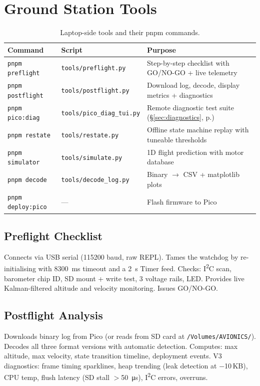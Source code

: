 \documentclass[11pt, a4paper, twoside]{article}
\newcommand{\file}[1]{\texttt{#1}}
\newcommand{\xref}[1]{(\S\ref{#1}, p.\pageref{#1})}
\begin{document}
\section{Ground Station Tools}
\label{sec:tools}

\begin{table}[ht]
\centering
\caption{Laptop-side tools and their pnpm commands.}
\label{tab:tools}
\begin{tabularx}{\textwidth}{l l X}
\toprule
\textbf{Command} & \textbf{Script} & \textbf{Purpose} \\
\midrule
\texttt{pnpm preflight} & \file{tools/preflight.py} & Step-by-step checklist with GO/NO-GO + live telemetry \\
\texttt{pnpm postflight} & \file{tools/postflight.py} & Download log, decode, display metrics + diagnostics \\
\texttt{pnpm pico:diag} & \file{tools/pico\_diag\_tui.py} & Remote diagnostic test suite \xref{sec:diagnostics} \\
\texttt{pnpm restate} & \file{tools/restate.py} & Offline state machine replay with tuneable thresholds \\
\texttt{pnpm simulator} & \file{tools/simulate.py} & 1D flight prediction with motor database \\
\texttt{pnpm decode} & \file{tools/decode\_log.py} & Binary $\to$ CSV + matplotlib plots \\
\texttt{pnpm deploy:pico} & --- & Flash firmware to Pico \\
\bottomrule
\end{tabularx}
\end{table}

\subsection{Preflight Checklist}
Connects via USB serial (115200 baud, raw REPL). Tames the watchdog by re-initialising with \SI{8300}{\milli\second} timeout and a \SI{2}{\second} Timer feed. Checks: I\textsuperscript{2}C scan, barometer chip ID, SD mount + write test, 3 voltage rails, LED. Provides live Kalman-filtered altitude and velocity monitoring. Issues GO/NO-GO.

\subsection{Postflight Analysis}
Downloads binary log from Pico (or reads from SD card at \texttt{/Volumes/AVIONICS/}). Decodes all three format versions with automatic detection. Computes: max altitude, max velocity, state transition timeline, deployment events. V3 diagnostics: frame timing sparklines, heap trending (leak detection at $-$10\,KB), CPU temp, flush latency (SD stall $>$\SI{50}{\micro\second}), I\textsuperscript{2}C errors, overruns.
\end{document}
